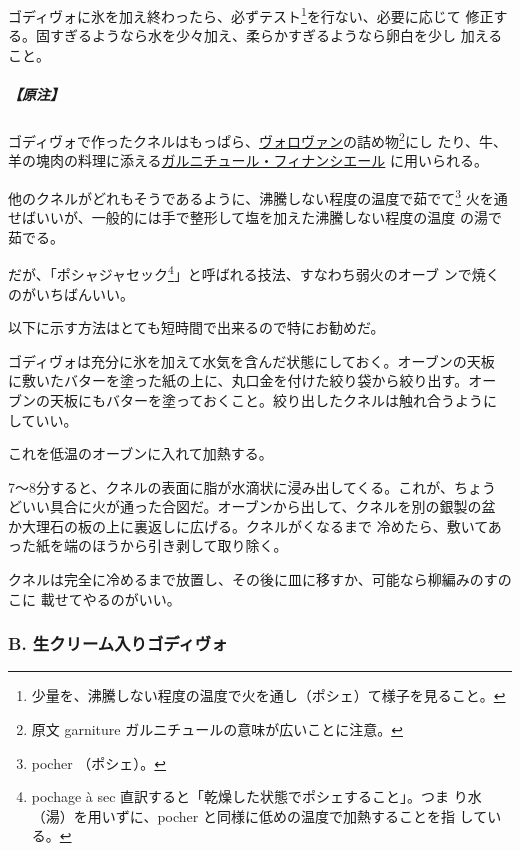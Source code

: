 \begin{recette}
ゴディヴォに氷を加え終わったら、必ずテスト\footnote{少量を、沸騰しない程度の温度で火を通し（ポシェ）て様子を見ること。}を行ない、必要に応じて
修正する。固すぎるようなら水を少々加え、柔らかすぎるようなら卵白を少し
加えること。

\hypertarget{nota-godiveau-a}{%
\subparagraph{【原注】}\label{nota-godiveau-a}}

ゴディヴォで作ったクネルはもっぱら、\protect\hyperlink{vol-au-vent}{ヴォロヴァン}の詰め物\footnote{原文
  garniture ガルニチュールの意味が広いことに注意。}にし
たり、牛、羊の塊肉の料理に添える\protect\hyperlink{garniture-financiere}{ガルニチュール・フィナンシエール}
に用いられる。

他のクネルがどれもそうであるように、沸騰しない程度の温度で茹でて\footnote{pocher
  （ポシェ）。}
火を通せばいいが、一般的には手で整形して塩を加えた沸騰しない程度の温度
の湯で茹でる。

だが、「ポシャジャセック\footnote{pochage à sec
  直訳すると「乾燥した状態でポシェすること」。つま
  り水（湯）を用いずに、pocher と同様に低めの温度で加熱することを指
  している。}」と呼ばれる技法、すなわち弱火のオーブ
ンで焼くのがいちばんいい。

以下に示す方法はとても短時間で出来るので特にお勧めだ。

ゴディヴォは充分に氷を加えて水気を含んだ状態にしておく。オーブンの天板
に敷いたバターを塗った紙の上に、丸口金を付けた絞り袋から絞り出す。オー
ブンの天板にもバターを塗っておくこと。絞り出したクネルは触れ合うように
していい。

これを低温のオーブンに入れて加熱する。

7〜8分すると、クネルの表面に脂が水滴状に浸み出してくる。これが、ちょう
どいい具合に火が通った合図だ。オーブンから出して、クネルを別の銀製の盆
か大理石の板の上に裏返しに広げる。クネルがくなるまで
冷めたら、敷いてあった紙を端のほうから引き剥して取り除く。

クネルは完全に冷めるまで放置し、その後に皿に移すか、可能なら柳編みのすのこに
載せてやるのがいい。

\maeaki

\hypertarget{godiveau-a-la-creme}{%
\subsubsection{B. 生クリーム入りゴディヴォ}\label{godiveau-a-la-creme}}




\end{recette}
